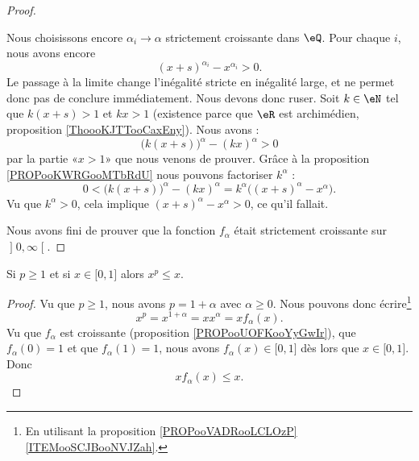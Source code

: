 \begin{proof}
\begin{subproof}
		\spitem[\(0< x\leq 1\)]
		Nous choisissons encore \( \alpha_i\to \alpha\) strictement croissante dans \( \eQ\). Pour chaque \( i\), nous avons encore
		\begin{equation}
			(x+s)^{\alpha_i}-x^{\alpha_i}>0.
		\end{equation}
		Le passage à la limite change l'inégalité stricte en inégalité large, et ne permet donc pas de conclure immédiatement. Nous devons donc ruser. Soit \( k\in \eN\) tel que \( k(x+s)>1\) et \( kx>1\) (existence parce que \( \eR\) est archimédien, proposition \ref{ThoooKJTTooCaxEny}). Nous avons :
		\begin{equation}
			\big( k(x+s) \big)^{\alpha}-(kx)^{\alpha}>0
		\end{equation}
		par la partie «\( x>1\)» que nous venons de prouver. Grâce à la proposition \ref{PROPooKWRGooMTbRdU} nous pouvons factoriser \( k^{\alpha}\) :
		\begin{equation}
			0<\big( k(x+s) \big)^{\alpha}-(kx)^{\alpha}=k^{\alpha}\big( (x+s)^{\alpha}-x^{\alpha} \big).
		\end{equation}
		Vu que \( k^{\alpha}>0\), cela implique \( (x+s)^{\alpha}-x^{\alpha}>0\), ce qu'il fallait.
	\end{subproof}
	Nous avons fini de prouver que la fonction \( f_{\alpha}\) était strictement croissante sur \( \mathopen] 0 , \infty \mathclose[\). 
\end{proof}

\begin{lemma}       \label{LEMooJVXQooDPUuuJ}
	Si \( p\geq 1\) et si \( x\in \mathopen[ 0 , 1 \mathclose]\) alors \( x^p\leq x\).
\end{lemma}

\begin{proof}
	Vu que \( p\geq 1\), nous avons \( p=1+\alpha\) avec \( \alpha\geq 0\). Nous pouvons donc écrire\footnote{En utilisant la proposition \ref{PROPooVADRooLCLOzP}\ref{ITEMooSCJBooNVJZah}.}
	\begin{equation}
		x^p=x^{1+\alpha}=xx^{\alpha}=xf_{\alpha}(x).
	\end{equation}
	Vu que \( f_{\alpha}\) est croissante (proposition \ref{PROPooUOFKooYyGwIr}), que \( f_{\alpha}(0)=1\) et que \( f_{\alpha}(1)=1\), nous avons \( f_{\alpha}(x)\in\mathopen[ 0 , 1 \mathclose]\) dès lors que \( x\in\mathopen[ 0 , 1 \mathclose]\). Donc
	\begin{equation}
		xf_{\alpha}(x)\leq x.
	\end{equation}
\end{proof}

